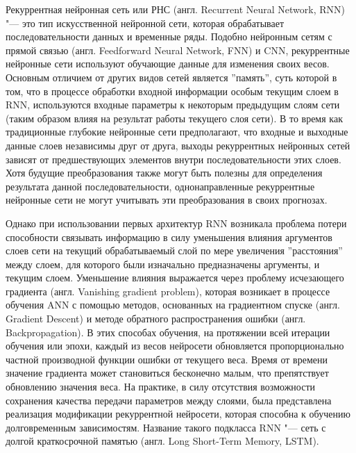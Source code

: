 \documentclass[bachelor, och, referat]{../shiza}
\begin{document}
            Рекуррентная нейронная сеть или РНС (англ. Recurrent Neural Network,
            RNN) "--- это тип искусственной нейронной сети, которая обрабатывает
            последовательности данных и временные ряды. Подобно нейронным сетям
            с прямой связью (англ. Feedforward Neural Network, FNN) и CNN,
            рекуррентные нейронные сети используют обучающие данные для
            изменения своих весов. Основным отличием от других видов сетей
            является ''память'', суть которой в том, что в процессе обработки
            входной информации особым текущим слоем в RNN, используются входные
            параметры к некоторым предыдущим слоям сети (таким образом влияя на
            результат работы текущего слоя сети). В то время как традиционные
            глубокие нейронные сети предполагают, что входные и выходные данные
            слоев независимы друг от друга, выходы рекуррентных нейронных сетей
            зависят от предшествующих элементов внутри последовательности этих
            слоев. Хотя будущие преобразования также могут быть полезны для
            определения результата данной последовательности, однонаправленные
            рекуррентные нейронные сети не могут учитывать эти преобразования в
            своих прогнозах.

            Однако при использовании первых архитектур RNN возникала проблема
            потери способности связывать информацию в силу уменьшения влияния
            аргументов слоев сети на текущий обрабатываемый слой по мере
            увеличения ''расстояния'' между слоем, для которого были изначально
            предназначены аргументы, и текущим слоем. Уменьшение влияния
            выражается через проблему исчезающего градиента (англ. Vanishing
            gradient problem), которая возникает в процессе обучения ANN с
            помощью методов, основанных на градиентном спуске (англ. Gradient
            Descent) и методе обратного распространения ошибки (англ.
            Backpropagation). В этих способах обучения, на протяжении всей
            итерации обучения или эпохи, каждый из весов нейросети обновляется
            пропорционально частной производной функции ошибки от текущего веса.
            Время от времени значение градиента может становиться бесконечно
            малым, что препятствует обновлению значения веса. На практике, в
            силу отсутствия возможности сохранения качества передачи параметров
            между слоями, была представлена реализация модификации рекуррентной
            нейросети, которая способна к обучению долговременным зависимостям.
            Название такого подкласса RNN "--- сеть с долгой краткосрочной
            памятью (англ. Long Short-Term Memory, LSTM).
\end{document}
